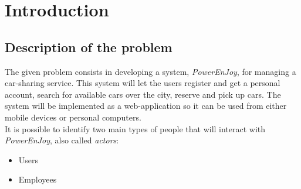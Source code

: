 \documentclass[11pt,a4paper]{report}
\begin{document}


\thispagestyle{empty}
\tableofcontents
\listoffigures
\cleardoublepage
{}
\pagestyle{fancy}
\chapter{Introduction}

\section{Description of the problem}
The given problem consists in developing a system, \textit{PowerEnJoy}, for managing a car-sharing service. This system will let the users register and get a personal account, search for available cars over the city, reserve and pick up cars. The system will be implemented as a web-application so it can be used from either mobile devices or personal computers.\\ 
It is possible to identify two main types of people that will interact with \textit{PowerEnJoy}, also called \textit{actors}:
	\begin{itemize}
		\item Users
		\item Employees
	\end{itemize}
\end{document}
